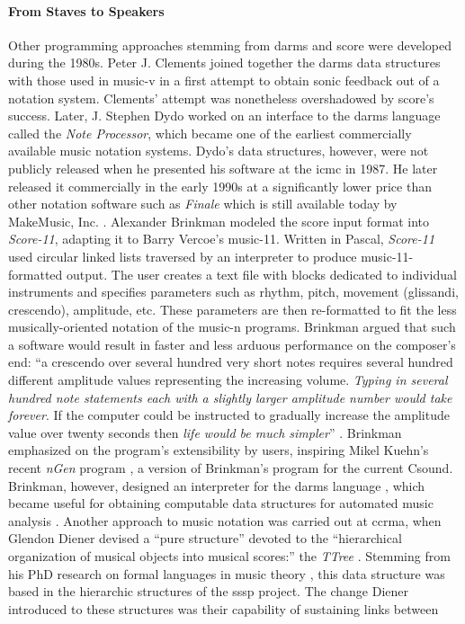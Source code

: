 \paragraph{From Staves to Speakers}
Other programming approaches stemming from \gls{darms} and \gls{score} were developed during the 1980s. Peter J. Clements \parencite{icmc/bbp2372.1980.020} joined together the \gls{darms} data structures with those used in \gls{music-v} in a first attempt to obtain sonic feedback out of a notation system. Clements' attempt was nonetheless overshadowed by \gls{score}'s success. Later, J. Stephen Dydo \parencite{icmc/bbp2372.1987.045} worked on an interface to the \gls{darms} language called the \textit{Note Processor}, which became one of the earliest commercially available music notation systems. Dydo's data structures, however, were not publicly released when he presented his software at the \gls{icmc} in 1987. He later released it commercially in the early 1990s at a significantly lower price than other notation software such as \textit{Finale} which is still available today by MakeMusic, Inc. \parencite{10.2307/941442,10.2307/940555}. Alexander Brinkman \parencite{icmc/bbp2372.1981.018} modeled the \gls{score} input format into \textit{Score-11}, adapting it to Barry Vercoe's \gls{music-11}. Written in Pascal, \textit{Score-11} used circular linked lists traversed by an interpreter to produce \gls{music-11}-formatted output. The user creates a text file with blocks dedicated to individual instruments and specifies parameters such as rhythm, pitch, movement (glissandi, crescendo), amplitude, etc. These parameters are then re-formatted to fit the less musically-oriented notation of the \gls{music-n} programs. Brinkman argued that such a software would result in faster and less arduous performance on the composer's end: ``a crescendo over several hundred very short notes requires several hundred different amplitude values representing the increasing volume. \textit{Typing in several hundred note statements each with a slightly larger amplitude number would take forever}. If the computer could be instructed to gradually increase the amplitude value over twenty seconds then \textit{life would be much simpler}'' \im \parencite{score11manual}. Brinkman emphasized on the program's extensibility by users, inspiring Mikel Kuehn's recent \textit{nGen} program \parencite{csoundMethods}, a version of Brinkman's program for the current Csound. Brinkman, however, designed an interpreter for the \gls{darms} language \parencite{icmc/bbp2372.1983.002}, which became useful for obtaining computable data structures for automated music analysis \parencite{icmc/bbp2372.1984.033}. Another approach to music notation was carried out at \gls{ccrma}, when Glendon Diener \parencite{icmc/bbp2372.1988.020, 10.2307/3680043} devised a ``pure structure'' devoted to the ``hierarchical organization of musical objects into musical scores:'' the \textit{TTree} \parencite[184]{icmc/bbp2372.1988.020}. Stemming from his PhD research on formal languages in music theory \parencite{diener1985}, this data structure was based in the hierarchic structures of the \gls{sssp} project. The change Diener introduced to these structures was their capability of sustaining links between 